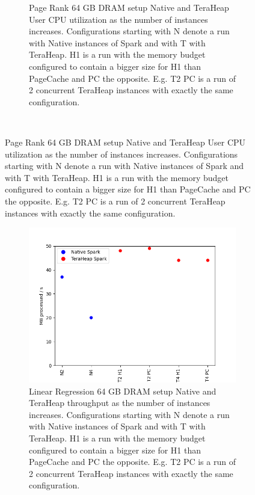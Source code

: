 \begin{figure}[htbp]
\begin{subfigure}[b]{0.48\textwidth}
    \caption{Page Rank 64 GB DRAM setup Native and TeraHeap User CPU utilization
    as the number of instances increases. Configurations starting with
    N denote a run with Native instances of Spark and with T with
    TeraHeap. H1 is a run with the memory budget configured to contain
    a bigger size for H1 than PageCache and PC the opposite. E.g. T2
    PC is a run of 2 concurrent TeraHeap instances with exactly the
    same configuration.}
		\label{fig:pr_64_usr}
	\end{subfigure}\\[1em]
\end{figure}

\begin{figure}[htbp]
	\centering
        \begin{subfigure}[b]{0.48\textwidth}
        \includegraphics[width=\linewidth]{./fig/LINR_64_THR.png}
    \caption{Linear Regression 64 GB DRAM setup Native and TeraHeap
    throughput as the number of instances increases. Configurations
    starting with N denote a run with Native instances of Spark and
    with T with TeraHeap. H1 is a run with the memory budget
    configured to contain a bigger size for H1 than PageCache and PC
    the opposite. E.g. T2 PC is a run of 2 concurrent TeraHeap
    instances with exactly the same configuration.}
		\label{fig:linr_64_thr}
        \end{subfigure}
        \begin{subfigure}[b]{0.48\textwidth}

\end{subfigure}
\end{figure}
